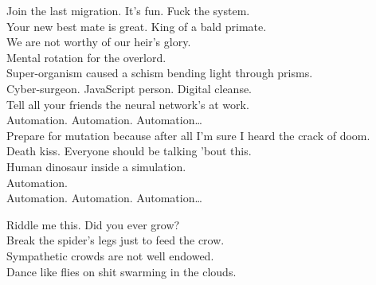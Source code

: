 
\label{album:kg}








Join the last migration. It's fun. Fuck the system. \\
Your new best mate is great. King of a bald primate. \\
We are not worthy of our heir's glory. \\
Mental rotation for the overlord. \\

Super-organism caused a schism bending light through prisms. \\
Cyber-surgeon. JavaScript person. Digital cleanse. \\
Tell all your friends the neural network's at work. \\

Automation. Automation. Automation… \\

Prepare for mutation because after all I'm sure I heard the crack of doom. \\
Death kiss. Everyone should be talking 'bout this. \\
Human  dinosaur inside a simulation. \\
Automation. \\

Automation. Automation. Automation… \\




Riddle me this. Did you ever grow? \\
Break the spider's legs just to feed the crow. \\
Sympathetic crowds are not well endowed. \\
Dance like flies on shit swarming in the clouds. \\

